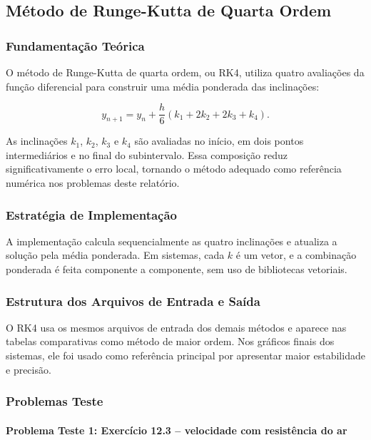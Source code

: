 \subsection{Método de Runge-Kutta de Quarta Ordem}

\subsubsection{Fundamentação Teórica}

O método de Runge-Kutta de quarta ordem, ou RK4, utiliza quatro avaliações da função diferencial para construir uma média ponderada das inclinações:

\[
    y_{n+1}=y_n+\frac{h}{6}(k_1+2k_2+2k_3+k_4).
\]

As inclinações \(k_1\), \(k_2\), \(k_3\) e \(k_4\) são avaliadas no início, em dois pontos intermediários e no final do subintervalo. Essa composição reduz significativamente o erro local, tornando o método adequado como referência numérica nos problemas deste relatório.

\subsubsection{Estratégia de Implementação}

A implementação calcula sequencialmente as quatro inclinações e atualiza a solução pela média ponderada. Em sistemas, cada \(k\) é um vetor, e a combinação ponderada é feita componente a componente, sem uso de bibliotecas vetoriais.

\subsubsection{Estrutura dos Arquivos de Entrada e Saída}

O RK4 usa os mesmos arquivos de entrada dos demais métodos e aparece nas tabelas comparativas como método de maior ordem. Nos gráficos finais dos sistemas, ele foi usado como referência principal por apresentar maior estabilidade e precisão.

\subsubsection{Problemas Teste}

\paragraph{Problema Teste 1: Exercício 12.3 -- velocidade com resistência do ar}

